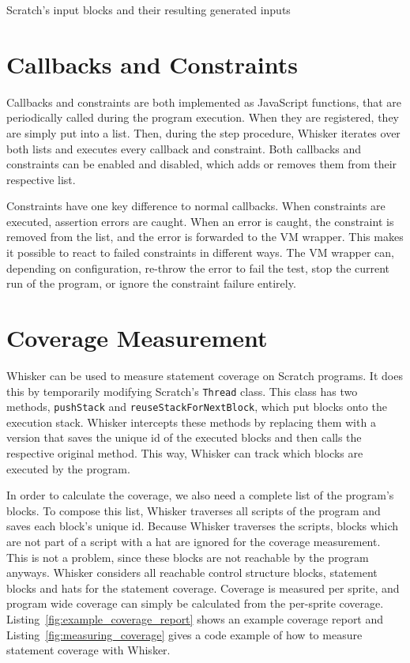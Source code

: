 \begin{table}[htpb]
    \caption{Scratch's input blocks and their resulting generated inputs}
    \label{tab:scratch_input_blocks}

    \renewcommand{\baselinestretch}{\oldbls}
\end{table}

\section{Callbacks and Constraints}
\label{sec:callbacks_and_constraints}

Callbacks and constraints are both implemented as JavaScript functions,
that are periodically called during the program execution.
When they are registered, they are simply put into a list.
Then, during the step procedure,
Whisker iterates over both lists and executes every callback and constraint.
Both callbacks and constraints can be enabled and disabled,
which adds or removes them from their respective list.
\parspace

Constraints have one key difference to normal callbacks.
When constraints are executed, assertion errors are caught.
When an error is caught, the constraint is removed from the list,
and the error is forwarded to the VM wrapper.
This makes it possible to react to failed constraints in different ways.
The VM wrapper can, depending on configuration, re-throw the error to fail the test,
stop the current run of the program,
or ignore the constraint failure entirely.

\section{Coverage Measurement}
\label{sec:coverage_measurement}

Whisker can be used to measure statement coverage on Scratch programs.
It does this by temporarily modifying Scratch's \texttt{Thread} class.
This class has two methods, \texttt{pushStack} and \texttt{reuseStackForNextBlock},
which put blocks onto the execution stack.
Whisker intercepts these methods by replacing them with a version
that saves the unique id of the executed blocks and then calls the respective original method.
This way, Whisker can track which blocks are executed by the program.
\parspace

In order to calculate the coverage, we also need a complete list of the program's blocks.
To compose this list, Whisker traverses all scripts of the program
and saves each block's unique id.
Because Whisker traverses the scripts, blocks which are not part of a script with a hat
are ignored for the coverage measurement.
This is not a problem, since these blocks are not reachable by the program anyways.
Whisker considers all reachable control structure blocks, statement blocks and hats for the statement coverage.
Coverage is measured per sprite, and program wide coverage can simply be calculated from the per-sprite coverage.
Listing~\ref{fig:example_coverage_report} shows an example coverage report and
Listing~\ref{fig:measuring_coverage} gives a code example of how to measure statement coverage with Whisker.
\parspace

